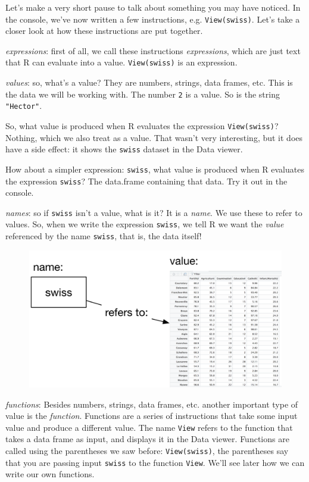\documentclass[12pt,]{book}
\theoremstyle{definition}
\theoremstyle{definition}
\theoremstyle{definition}
\theoremstyle{remark}
\begin{document}
Let's make a very short pause to talk about something you may have
noticed. In the console, we've now written a few instructions, e.g.
\texttt{View(swiss)}. Let's take a closer look at how these instructions
are put together.

\emph{expressions}: first of all, we call these instructions
\emph{expressions}, which are just text that R can evaluate into a
value. \texttt{View(swiss)} is an expression.

\emph{values}: so, what's a value? They are numbers, strings, data
frames, etc. This is the data we will be working with. The number
\texttt{2} is a value. So is the string \texttt{"Hector"}.

So, what value is produced when R evaluates the expression
\texttt{View(swiss)}? Nothing, which we also treat as a value. That
wasn't very interesting, but it does have a side effect: it shows the
\texttt{swiss} dataset in the Data viewer.

How about a simpler expression: \texttt{swiss}, what value is produced
when R evaluates the expression \texttt{swiss}? The data.frame
containing that data. Try it out in the console.

\emph{names}: so if \texttt{swiss} isn't a value, what is it? It is a
\emph{name}. We use these to refer to values. So, when we write the
expression \texttt{swiss}, we tell R we want the \emph{value} referenced
by the name \texttt{swiss}, that is, the data itself!

\begin{figure}
\centering
\includegraphics{img/names_values.png}
\caption{}
\end{figure}

\emph{functions}: Besides numbers, strings, data frames, etc. another
important type of value is the \emph{function}. Functions are a series
of instructions that take some input value and produce a different
value. The name \texttt{View} refers to the function that takes a data
frame as input, and displays it in the Data viewer. Functions are called
using the parentheses we saw before: \texttt{View(swiss)}, the
parentheses say that you are passing input \texttt{swiss} to the
function \texttt{View}. We'll see later how we can write our own
functions.
\end{document}
